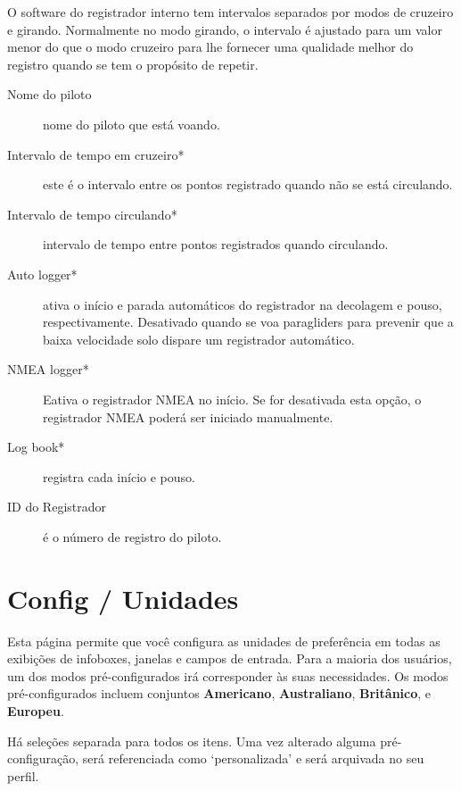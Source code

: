 O software do registrador interno tem intervalos separados por modos de cruzeiro e girando.  Normalmente no modo girando, o intervalo é ajustado para um valor menor do que o modo cruzeiro para lhe fornecer uma qualidade melhor do registro quando se tem o propósito de repetir.

\begin{description}
\item[Nome do piloto] nome do piloto que está voando.
\item[Intervalo de tempo em cruzeiro*]  este é o intervalo entre os pontos registrado quando não se está circulando.
\item[Intervalo de tempo circulando*]  intervalo de tempo entre pontos registrados quando circulando.
\item[Auto logger*]  ativa o início e parada automáticos do registrador na decolagem e pouso, respectivamente.  Desativado quando se voa paragliders para prevenir que a baixa velocidade solo dispare um registrador automático.
\item[NMEA logger*]  Eativa o registrador NMEA no início.  Se for desativada esta opção, o registrador NMEA poderá ser iniciado manualmente.
\item[Log book*]  registra cada início e pouso.
\item[ID do Registrador] é o número de registro do piloto.
\end{description}


\section{Config / Unidades}

Esta página permite que você configura as unidades de preferência em todas as exibições de infoboxes, janelas e campos de entrada.   Para a maioria dos usuários, um dos modos pré-configurados irá corresponder às suas necessidades.  Os modos pré-configurados incluem conjuntos  {\bf Americano}, {\bf Australiano}, {\bf Britânico}, 
e {\bf Europeu}.

Há seleções separada para todos os itens.  Uma vez alterado alguma pré-configuração, será referenciada como ‘personalizada’ e será arquivada no seu perfil.

